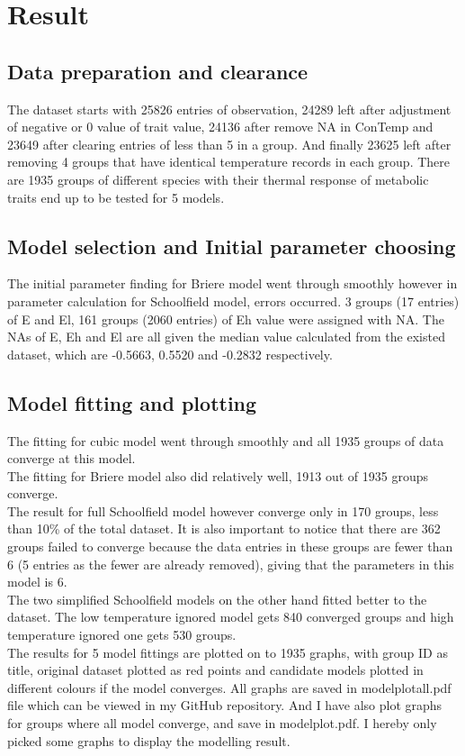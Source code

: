 \documentclass[12pt,a4paper]{article}
\begin{document}
\section{Result}
\subsection{Data preparation and clearance}
The dataset starts with 25826 entries of observation, 24289 left after adjustment of negative or 0 value of trait value, 24136 after remove NA in ConTemp and 23649 after clearing entries of less than 5 in a group. And finally 23625 left after removing 4 groups that have identical temperature records in each group. There are 1935 groups of different species with their thermal response of metabolic traits end up to be tested for 5 models.
\subsection{Model selection and Initial parameter choosing}
The initial parameter finding for Briere model went through smoothly however in parameter calculation for Schoolfield model, errors occurred. 3 groups (17 entries) of E and El, 161 groups (2060 entries) of Eh value were assigned with NA. The NAs of E, Eh and El are all given the median value calculated from the existed dataset, which are -0.5663, 0.5520 and -0.2832 respectively.
\subsection{Model fitting and plotting}
The fitting for cubic model went through smoothly and all 1935 groups of data converge at this model.
\\
The fitting for Briere model also did relatively well, 1913 out of 1935 groups converge.
\\
The result for full Schoolfield model however converge only in 170 groups, less than 10\% of the total dataset. It is also important to notice that there are 362 groups failed to converge because the data entries in these groups are fewer than 6 (5 entries as the fewer are already removed), giving that the parameters in this model is 6.
\\
The two simplified Schoolfield models on the other hand fitted better to the dataset. The low temperature ignored model gets 840 converged groups and high temperature ignored one gets 530 groups.
\\
The results for 5 model fittings are plotted on to 1935 graphs, with group ID as title, original dataset plotted as red points and candidate models plotted in different colours if the model converges. All graphs are saved in model\textunderscore plot\textunderscore all.pdf file which can be viewed in my GitHub repository. And I have also plot graphs for groups where all model converge, and save in model\textunderscore plot.pdf. I hereby only picked some graphs to display the modelling result.
\end{document}
